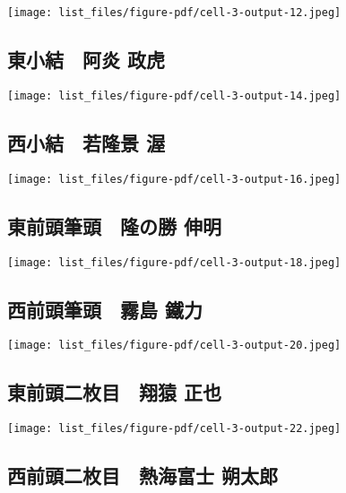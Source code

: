\documentclass[
]{bxjsarticle}
\begin{document}
\texttt{[image: list\_files/figure-pdf/cell-3-output-12.jpeg]}

\subsection{東小結　阿炎
政虎}\label{ux6771ux5c0fux7d50-ux963fux708e-ux653fux864e}

\texttt{[image: list\_files/figure-pdf/cell-3-output-14.jpeg]}

\subsection{西小結　若隆景
渥}\label{ux897fux5c0fux7d50-ux82e5ux9686ux666f-ux6e25}

\texttt{[image: list\_files/figure-pdf/cell-3-output-16.jpeg]}

\subsection{東前頭筆頭　隆の勝
伸明}\label{ux6771ux524dux982dux7b46ux982d-ux9686ux306eux52dd-ux4f38ux660e}

\texttt{[image: list\_files/figure-pdf/cell-3-output-18.jpeg]}

\subsection{西前頭筆頭　霧島
鐵力}\label{ux897fux524dux982dux7b46ux982d-ux9727ux5cf6-ux9435ux529b}

\texttt{[image: list\_files/figure-pdf/cell-3-output-20.jpeg]}

\subsection{東前頭二枚目　翔猿
正也}\label{ux6771ux524dux982dux4e8cux679aux76ee-ux7fd4ux733f-ux6b63ux4e5f}

\texttt{[image: list\_files/figure-pdf/cell-3-output-22.jpeg]}

\subsection{西前頭二枚目　熱海富士
朔太郎}\label{ux897fux524dux982dux4e8cux679aux76ee-ux71b1ux6d77ux5bccux58eb-ux6714ux592aux90ce}
\end{document}
